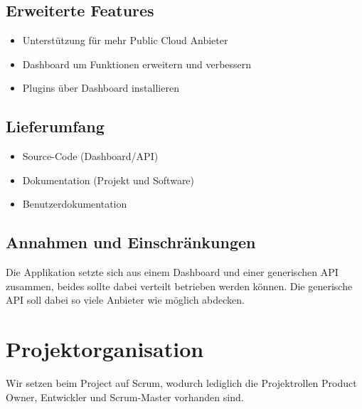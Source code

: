 \documentclass[11pt]{scrartcl}
\begin{document}
\subsection{Erweiterte Features}
\begin{itemize}
  \item Unterstützung für mehr Public Cloud Anbieter
  \item Dashboard um Funktionen erweitern und verbessern
  \item Plugins über Dashboard installieren
\end{itemize}
\subsection{Lieferumfang}
\begin{itemize}
  \item Source-Code (Dashboard/API)
  \item Dokumentation (Projekt und Software)
  \item Benutzerdokumentation
\end{itemize}

\subsection{Annahmen und Einschränkungen}
Die Applikation setzte sich aus einem Dashboard und einer generischen API 
zusammen, beides sollte dabei verteilt betrieben werden können.
Die generische API soll dabei so viele Anbieter wie möglich abdecken.
\section{Projektorganisation}
Wir setzen beim Project auf Scrum, wodurch lediglich die Projektrollen Product 
Owner, Entwickler und Scrum-Master vorhanden sind.
\end{document}
